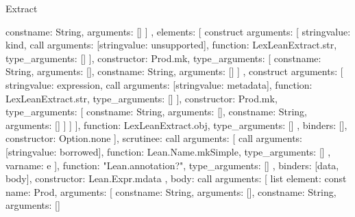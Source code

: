 \begin{lexlean}{Extract}
\begin{toolingmodule}
{{{{{{{{{                            const{name: String, arguments: []}
                          ]
                        },
                        elements: [
                          construct{
                            arguments: [
                              string{value: kind},
                              call{
                                arguments: [string{value: unsupported}],
                                function: LexLeanExtract.str,
                                type_arguments: []
                              }
                            ],
                            constructor: Prod.mk,
                            type_arguments: [
                              const{name: String, arguments: []},
                              const{name: String, arguments: []}
                            ]
                          },
                          construct{
                            arguments: [
                              string{value: expression},
                              call{
                                arguments: [string{value: metadata}],
                                function: LexLeanExtract.str,
                                type_arguments: []
                              }
                            ],
                            constructor: Prod.mk,
                            type_arguments: [
                              const{name: String, arguments: []},
                              const{name: String, arguments: []}
                            ]
                          }
                        ]
                      }
                    ],
                    function: LexLeanExtract.obj,
                    type_arguments: []
                  },
                  binders: [],
                  constructor: Option.none
                }
              ],
              scrutinee: call{
                arguments: [
                  call{
                    arguments: [string{value: borrowed}],
                    function: Lean.Name.mkSimple,
                    type_arguments: []
                  },
                  var{name: e}
                ],
                function: "Lean.annotation?",
                type_arguments: []
              }
            },
            binders: [data, body],
            constructor: Lean.Expr.mdata
          },
          {
            body: call{
              arguments: [
                list{
                  element: const{
                    name: Prod,
                    arguments: [
                      const{name: String, arguments: []},
                      const{name: String, arguments: []}
}}}}}}}
\end{toolingmodule}
\end{lexlean}
